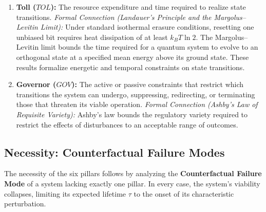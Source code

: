 \begin{enumerate}[label={}, leftmargin=0pt]
    \item \textbf{Toll ($TOL$):}
    The resource expenditure and time required to realize state transitions.
    \textit{Formal Connection (Landauer's Principle and the Margolus--Levitin Limit\cite{landauer_irreversibility_1961,margolus_maximum_1998}):} Under standard isothermal erasure conditions, resetting one unbiased bit requires heat dissipation of at least $k_BT\ln 2$. The Margolus--Levitin limit bounds the time required for a quantum system to evolve to an orthogonal state at a specified mean energy above its ground state. These results formalize energetic and temporal constraints on state transitions.

    \item \textbf{Governor ($GOV$):}
    The active or passive constraints that restrict which transitions the system can undergo, suppressing, redirecting, or terminating those that threaten its viable operation.
    \textit{Formal Connection (Ashby's Law of Requisite Variety\cite{ashby_introduction_1956}):} Ashby's law bounds the regulatory variety required to restrict the effects of disturbances to an acceptable range of outcomes.
\end{enumerate}

\subsection{Necessity: Counterfactual Failure Modes}
\label{subsec:pillars_necessity}
The necessity of the six pillars follows by analyzing the \textbf{Counterfactual Failure Mode} of a system lacking exactly one pillar. In every case, the system's viability collapses, limiting its expected lifetime $\tau$ to the onset of its characteristic perturbation.

